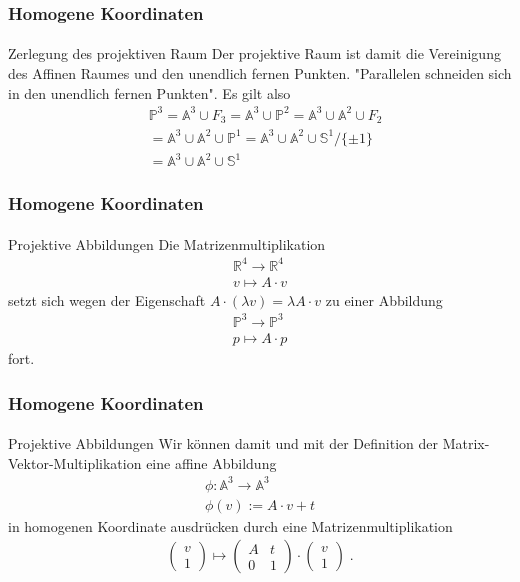\documentclass{beamer}
\begin{document}
\begin{frame}
    \frametitle{Homogene Koordinaten}
\framesubtitle{}
\begin{block}{Zerlegung des projektiven Raum}
Der projektive Raum ist damit die Vereinigung des Affinen Raumes und den unendlich fernen Punkten. "Parallelen schneiden sich in den unendlich fernen Punkten".
Es gilt also 
\begin{align*}
& \mathbb{P}^3 = \mathbb{A}^3 \cup F_3 = \mathbb{A}^3  \cup \mathbb{P}^2 =  \mathbb{A}^3  \cup \mathbb{A}^2 \cup F_2  \\  
& =\mathbb{A}^3  \cup \mathbb{A}^2 \cup  \mathbb{P}^1 =   \mathbb{A}^3  \cup \mathbb{A}^2 \cup  \mathbb{S}^1/ \{ \pm  1\} \\
& =  \mathbb{A}^3  \cup \mathbb{A}^2 \cup  \mathbb{S}^1
\end{align*}
\end{block}
\end{frame}

\begin{frame}
    \frametitle{Homogene Koordinaten}
\framesubtitle{}
\begin{block}{Projektive Abbildungen}
Die Matrizenmultiplikation
\begin{align*}
\mathbb{R}^{4} \to \mathbb{R}^{4} \\
v \mapsto A \cdot v
\end{align*}
setzt sich wegen der Eigenschaft $A \cdot (\lambda v) = \lambda A \cdot v$ zu einer Abbildung
\begin{align*}
\mathbb{P}^{3} \to \mathbb{P}^{3} \\
p \mapsto A \cdot p
\end{align*}
fort. 
\end{block}
\end{frame}

\begin{frame}
    \frametitle{Homogene Koordinaten}
\framesubtitle{}
\begin{block}{Projektive Abbildungen}
Wir können damit und mit der Definition der Matrix-Vektor-Multiplikation eine affine Abbildung 
\begin{align*}
\phi : \mathbb{A}^{3} \to \mathbb{A}^{3} \\
\phi(v):=  A \cdot v + t
\end{align*}
in homogenen Koordinate ausdrücken durch eine Matrizenmultiplikation
\begin{align*}
\begin{pmatrix} v \\ 1\end{pmatrix} \mapsto \begin{pmatrix}  A  & t  \\ 0 &1\end{pmatrix} \cdot  \begin{pmatrix} v \\ 1\end{pmatrix}   \; .
\end{align*}
\end{block}
\end{frame}
\end{document}
